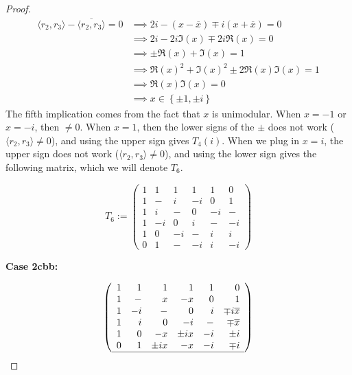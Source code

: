\begin{lemma}
\begin{proof}
\begin{equation}
\begin{array}{rl}
\langle r_2 , r_3 \rangle - \overline{\langle r_2 , r_3 \rangle} = 0
&\implies 2i-(x-\overline{x})\mp i (x+\overline{x})=0 \\
&\implies 2i-2i\Im(x)\mp2i\Re(x)=0\\
&\implies \pm \Re(x) + \Im(x) = 1 \\
&\implies \Re(x)^2+\Im(x)^2\pm2\Re(x)\Im(x)=1 \\
&\implies \Re(x)\Im(x)=0 \\
&\implies x \in \left\{\pm 1,\pm i\right\}
\end{array}
\end{equation}
The fifth implication comes from the fact that $x$ is unimodular. When $x = -1$ or $x = -i$, then  $\neq 0$. When $x=1$, then the lower signs of the $\pm$ does not work ($\langle r_2 , r_3 \rangle \neq 0$), and using the upper sign gives $T_4(i)$. When we plug in $x=i$, the upper sign does not work ($\langle r_2 , r_3 \rangle \neq 0$), and using the lower sign gives the following matrix, which we will denote $T_6$.

\begin{equation} \label{mat:t6}
T_6 := \left(\begin{array}{rrrrrr}
                1 &  1 & 1  &  1 &  1 & 0 \\
                1 &  - & i  & -i &  0 & 1 \\
                1 &  i & -  &  0 & -i & - \\
                1 & -i & 0  &  i &  - & -i \\
                1 &  0 & -i &  - &  i & i \\
                0 &  1 & -  & -i & i & -i
              \end{array}\right)
\end{equation}

{\bf Case 2cbb:}

\begin{equation} \label{mat:2cbb-1}
\left(\begin{array}{rrrrrr}
               1 &  1 & 1  &  1 &  1 & 0 \\
               1 &  - & x  & -x &  0 & 1 \\
               1 &  -i & -  &  0 & i & \mp i\overline{x} \\
               1 & i & 0  &  -i &  - & \mp\overline{x} \\
               1 &  0 & -x &  \pm ix &  -i & \pm i \\
               0 &  1 & \pm ix  & -x & -i & \mp i \\ \hline
             \end{array}\right)
\end{equation}


\end{proof}
\end{lemma}
